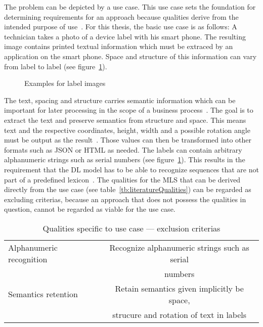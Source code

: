 The problem can be depicted by a use case.
This use case sets the foundation for determining requirements for an
approach because qualities derive from the intended purpose of
use~\citep{siebert_construction_2021}.
For this thesis, the basic use case is as follows:
A technician takes a photo of a device label with his smart phone.
The resulting image contains printed textual information which must be extraced by an application on
the smart phone.
Space and structure of this information can vary from label to label (see figure~\ref{fig:examples}).
\begin{figure}[h]
    \centering
    \caption{Examples for label images\label{fig:examples}}
\end{figure}
The text, spacing and structure carries semantic information which can be important for later
processing in the scope of a business process~\citep{chen_text_2021}.
The goal is to extract the text and preserve semantics from structure and space.
This means text and the respective coordinates, height, width and a possible rotation angle must
be output as the result~\citep{yang_learning_2021}.
Those values can then be transformed into other formats such as JSON or HTML as needed.
The labels can contain arbitrary alphanumeric strings such as serial numbers (see
figure~\ref{fig:examples}).
This results in the requirement that the \ac{DL} model has to be able to recognize sequences that
are not part of a predefined lexicon~\citep{ghosh_visual_2017}.
The qualities for the \ac{MLS} that can be derived directly from the use case (see
table~\ref{tb:literatureQualities}) can be regarded as excluding criterias, because an approach
that does not possess the qualities in question, cannot be regarded as viable for the use case.
\begin{table}[h]
    \centering
    \begin{tabular}{l c}
        Alphanumeric recognition    & Recognize alphanumeric strings such as serial \\
                                    & numbers \\
        Semantics retention & Retain semantics given implicitly be space, \\
                            & strucure and rotation of text in labels \\
    \end{tabular}
    \caption{Qualities specific to use case --- exclusion criterias}
\end{table}

